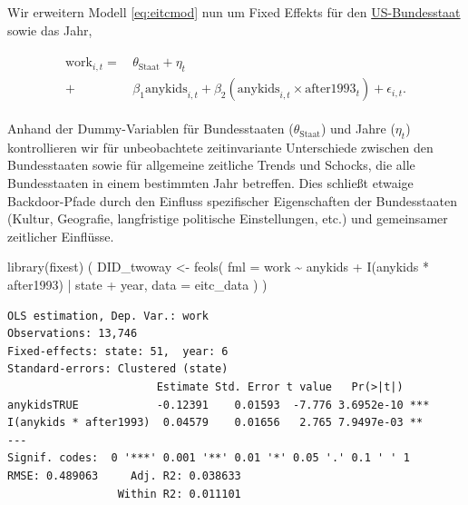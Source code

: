 \documentclass[
  a4paper,
  DIV=11,
  oneside]{scrreprt}
\newenvironment{Shaded}{\begin{snugshade}}{\end{snugshade}}
\newcommand{\AttributeTok}[1]{\textcolor[rgb]{0.40,0.45,0.13}{#1}}
\newcommand{\FunctionTok}[1]{\textcolor[rgb]{0.28,0.35,0.67}{#1}}
\newcommand{\NormalTok}[1]{\textcolor[rgb]{0.00,0.23,0.31}{#1}}
\newcommand{\OtherTok}[1]{\textcolor[rgb]{0.00,0.23,0.31}{#1}}
\newcommand{\SpecialCharTok}[1]{\textcolor[rgb]{0.37,0.37,0.37}{#1}}
\begin{document}
Wir erweitern Modell \eqref{eq:eitcmod} nun um Fixed Effekts für den
\href{https://cps.ipums.org/cps-action/variables/statefip}{US-Bundesstaat}
sowie das Jahr,

\begin{align}
  \begin{split}
    \text{work}_{i,t} =&\, \theta_\text{Staat} + \eta_t \\
    +&\, \beta_1 \text{anykids}_{i,t} + \beta_2 (\text{anykids}_{i,t} \times \text{after1993}_t) + \epsilon_{i,t}.
    \end{split}\label{eq:eitcmodfe}
\end{align}

Anhand der Dummy-Variablen für Bundesstaaten (\(\theta_\text{Staat}\))
und Jahre (\(\eta_t\)) kontrollieren wir für unbeobachtete
zeitinvariante Unterschiede zwischen den Bundesstaaten sowie für
allgemeine zeitliche Trends und Schocks, die alle Bundesstaaten in einem
bestimmten Jahr betreffen. Dies schließt etwaige Backdoor-Pfade durch
den Einfluss spezifischer Eigenschaften der Bundesstaaten (Kultur,
Geografie, langfristige politische Einstellungen, etc.) und gemeinsamer
zeitlicher Einflüsse.

\begin{Shaded}
\begin{Highlighting}[]
\FunctionTok{library}\NormalTok{(fixest)}
\NormalTok{(}
\NormalTok{  DID\_twoway }\OtherTok{\textless{}{-}} \FunctionTok{feols}\NormalTok{(}
    \AttributeTok{fml =}\NormalTok{ work }\SpecialCharTok{\textasciitilde{}}\NormalTok{ anykids }\SpecialCharTok{+} \FunctionTok{I}\NormalTok{(anykids }\SpecialCharTok{*}\NormalTok{ after1993) }
    \SpecialCharTok{|}\NormalTok{ state }\SpecialCharTok{+}\NormalTok{ year,}
    \AttributeTok{data =}\NormalTok{ eitc\_data}
\NormalTok{  )}
\NormalTok{)}
\end{Highlighting}
\end{Shaded}

\begin{verbatim}
OLS estimation, Dep. Var.: work
Observations: 13,746
Fixed-effects: state: 51,  year: 6
Standard-errors: Clustered (state) 
                       Estimate Std. Error t value   Pr(>|t|)    
anykidsTRUE            -0.12391    0.01593  -7.776 3.6952e-10 ***
I(anykids * after1993)  0.04579    0.01656   2.765 7.9497e-03 ** 
---
Signif. codes:  0 '***' 0.001 '**' 0.01 '*' 0.05 '.' 0.1 ' ' 1
RMSE: 0.489063     Adj. R2: 0.038633
                 Within R2: 0.011101
\end{verbatim}
\end{document}
